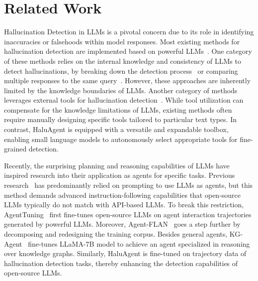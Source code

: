 \section{Related Work}

Hallucination Detection in LLMs is a pivotal concern due to its role in identifying inaccuracies or falsehoods within model responses. Most existing methods for hallucination detection are implemented based on powerful LLMs~\cite{luo2024hallucination}. One category of these methods relies on the internal knowledge and consistency of LLMs to detect hallucinations, by breaking down the detection process~\cite{dhuliawala2023chain} or comparing multiple responses to the same query~\cite{manakul2023selfcheckgpt}. 
However, these approaches are inherently limited by the knowledge boundaries of LLMs. Another category of methods leverages external tools for hallucination detection~\cite{chern2023factool, wei2024long}. 
While tool utilization can compensate for the knowledge limitations of LLMs, existing methods often require manually designing specific tools tailored to particular text types. In contrast, HaluAgent is equipped with a versatile and expandable toolbox, enabling small language models to autonomously select appropriate tools for fine-grained detection.

Recently, the surprising planning and reasoning capabilities of LLMs have inspired research into their application as agents for specific tasks. 
Previous research~\cite{yao2023react, nakano2021webgpt, singh2023progprompt, yang2023mm} has predominantly relied on prompting to use LLMs as agents, but this method demands advanced instruction-following capabilities that open-source LLMs typically do not match with API-based LLMs.
To break this restriction, AgentTuning~\cite{zeng2023agenttuning} first fine-tunes open-source LLMs on agent interaction trajectories generated by powerful LLMs. Moreover, Agent-FLAN~\cite{chen2024agent} goes a step further by decomposing and redesigning the training corpus.
Besides general agents, KG-Agent~\cite{KGAgent} fine-tunes LLaMA-7B model to achieve an agent specialized in reasoning over knowledge graphs. Similarly, HaluAgent is fine-tuned on trajectory data of hallucination detection tasks, thereby enhancing the detection capabilities of open-source LLMs.